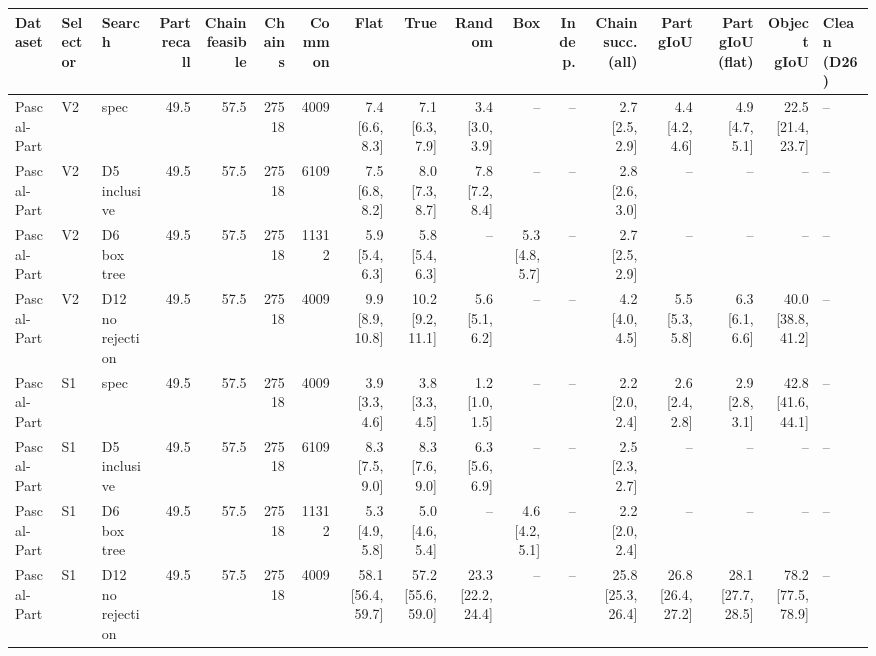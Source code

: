 \begin{tabular}{lllrrrrrrrrrrrrrl}
\toprule
Dataset & Selector & Search & Part recall & Chain feasible & Chains & Common & Flat & True & Random & Box & Indep. & Chain succ. (all) & Part gIoU & Part gIoU (flat) & Object gIoU & Clean (D26) \\
\midrule
Pascal-Part & V2 & spec & 49.5 & 57.5 & 27518 & 4009 & 7.4 \scriptsize{[6.6, 8.3]} & 7.1 \scriptsize{[6.3, 7.9]} & 3.4 \scriptsize{[3.0, 3.9]} & -- & -- & 2.7 \scriptsize{[2.5, 2.9]} & 4.4 \scriptsize{[4.2, 4.6]} & 4.9 \scriptsize{[4.7, 5.1]} & 22.5 \scriptsize{[21.4, 23.7]} & -- \\
Pascal-Part & V2 & D5 inclusive & 49.5 & 57.5 & 27518 & 6109 & 7.5 \scriptsize{[6.8, 8.2]} & 8.0 \scriptsize{[7.3, 8.7]} & 7.8 \scriptsize{[7.2, 8.4]} & -- & -- & 2.8 \scriptsize{[2.6, 3.0]} & -- & -- & -- & -- \\
Pascal-Part & V2 & D6 box tree & 49.5 & 57.5 & 27518 & 11312 & 5.9 \scriptsize{[5.4, 6.3]} & 5.8 \scriptsize{[5.4, 6.3]} & -- & 5.3 \scriptsize{[4.8, 5.7]} & -- & 2.7 \scriptsize{[2.5, 2.9]} & -- & -- & -- & -- \\
Pascal-Part & V2 & D12 no rejection & 49.5 & 57.5 & 27518 & 4009 & 9.9 \scriptsize{[8.9, 10.8]} & 10.2 \scriptsize{[9.2, 11.1]} & 5.6 \scriptsize{[5.1, 6.2]} & -- & -- & 4.2 \scriptsize{[4.0, 4.5]} & 5.5 \scriptsize{[5.3, 5.8]} & 6.3 \scriptsize{[6.1, 6.6]} & 40.0 \scriptsize{[38.8, 41.2]} & -- \\
Pascal-Part & S1 & spec & 49.5 & 57.5 & 27518 & 4009 & 3.9 \scriptsize{[3.3, 4.6]} & 3.8 \scriptsize{[3.3, 4.5]} & 1.2 \scriptsize{[1.0, 1.5]} & -- & -- & 2.2 \scriptsize{[2.0, 2.4]} & 2.6 \scriptsize{[2.4, 2.8]} & 2.9 \scriptsize{[2.8, 3.1]} & 42.8 \scriptsize{[41.6, 44.1]} & -- \\
Pascal-Part & S1 & D5 inclusive & 49.5 & 57.5 & 27518 & 6109 & 8.3 \scriptsize{[7.5, 9.0]} & 8.3 \scriptsize{[7.6, 9.0]} & 6.3 \scriptsize{[5.6, 6.9]} & -- & -- & 2.5 \scriptsize{[2.3, 2.7]} & -- & -- & -- & -- \\
Pascal-Part & S1 & D6 box tree & 49.5 & 57.5 & 27518 & 11312 & 5.3 \scriptsize{[4.9, 5.8]} & 5.0 \scriptsize{[4.6, 5.4]} & -- & 4.6 \scriptsize{[4.2, 5.1]} & -- & 2.2 \scriptsize{[2.0, 2.4]} & -- & -- & -- & -- \\
Pascal-Part & S1 & D12 no rejection & 49.5 & 57.5 & 27518 & 4009 & 58.1 \scriptsize{[56.4, 59.7]} & 57.2 \scriptsize{[55.6, 59.0]} & 23.3 \scriptsize{[22.2, 24.4]} & -- & -- & 25.8 \scriptsize{[25.3, 26.4]} & 26.8 \scriptsize{[26.4, 27.2]} & 28.1 \scriptsize{[27.7, 28.5]} & 78.2 \scriptsize{[77.5, 78.9]} & -- \\

\end{tabular}
